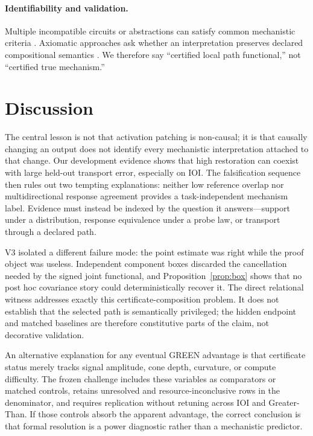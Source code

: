 \documentclass{article}
\begin{document}
\paragraph{Identifiability and validation.}
Multiple incompatible circuits or abstractions can satisfy common mechanistic criteria \citep{meloux2025identifiable}. Axiomatic approaches ask whether an interpretation preserves declared compositional semantics \citep{palumbo2025axiomatic}. We therefore say ``certified local path functional,'' not ``certified true mechanism.''

\section{Discussion}
\label{sec:discussion}

The central lesson is not that activation patching is non-causal; it is that causally changing an output does not identify every mechanistic interpretation attached to that change. Our development evidence shows that high restoration can coexist with large held-out transport error, especially on IOI. The falsification sequence then rules out two tempting explanations: neither low reference overlap nor multidirectional response agreement provides a task-independent mechanism label. Evidence must instead be indexed by the question it answers---support under a distribution, response equivalence under a probe law, or transport through a declared path.

V3 isolated a different failure mode: the point estimate was right while the proof object was useless. Independent component boxes discarded the cancellation needed by the signed joint functional, and Proposition~\ref{prop:box} shows that no post hoc covariance story could deterministically recover it. The direct relational witness addresses exactly this certificate-composition problem. It does not establish that the selected path is semantically privileged; the hidden endpoint and matched baselines are therefore constitutive parts of the claim, not decorative validation.

An alternative explanation for any eventual GREEN advantage is that certificate status merely tracks signal amplitude, cone depth, curvature, or compute difficulty. The frozen challenge includes these variables as comparators or matched controls, retains unresolved and resource-inconclusive rows in the denominator, and requires replication without retuning across IOI and Greater-Than. If those controls absorb the apparent advantage, the correct conclusion is that formal resolution is a power diagnostic rather than a mechanistic predictor.
\end{document}

